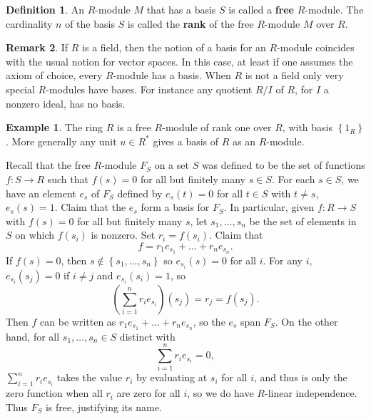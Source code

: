 \documentclass{article}
\newcommand{\rb}[1]{\left( #1 \right)}
\newcommand{\cb}[1]{\left\{ #1 \right\}}
\theoremstyle{definition}\newtheorem{definition}{Definition}[subsection]
\theoremstyle{definition}\newtheorem{remark}[definition]{Remark}
\theoremstyle{definition}\newtheorem*{example}{Example}
\theoremstyle{definition}\newtheorem*{note}{Note}
\begin{document}
\begin{definition}
An $ R $-module $ M $ that has a basis $ S $ is called a \textbf{free} $ R $-module. The cardinality $ n $ of the basis $ S $ is called the \textbf{rank} of the free $ R $-module $ M $ over $ R $.
\end{definition}


\begin{remark}
If $ R $ is a field, then the notion of a basis for an $ R $-module coincides with the usual notion for vector spaces. In this case, at least if one assumes the axiom of choice, every $ R $-module has a basis. When $ R $ is not a field only very special $ R $-modules have bases. For instance any quotient $ R / I $ of $ R $, for $ I $ a nonzero ideal, has no basis.
\end{remark}

\begin{example}
The ring $ R $ is a free $ R $-module of rank one over $ R $, with basis $ \cb{1_R} $. More generally any unit $ u \in R^* $ gives a basis of $ R $ as an $ R $-module.
\end{example}

Recall that the free $ R $-module $ F_S $ on a set $ S $ was defined to be the set of functions $ f : S \to R $ such that $ f\rb{s} = 0 $ for all but finitely many $ s \in S $. For each $ s \in S $, we have an element $ e_s $ of $ F_S $ defined by $ e_s\rb{t} = 0 $ for all $ t \in S $ with $ t \ne s $, $ e_s\rb{s} = 1 $. Claim that the $ e_s $ form a basis for $ F_S $. In particular, given $ f : R \to S $ with $ f\rb{s} = 0 $ for all but finitely many $ s $, let $ s_1, \dots, s_n $ be the set of elements in $ S $ on which $ f\rb{s_i} $ is nonzero. Set $ r_i = f\rb{s_i} $. Claim that
$$ f = r_1e_{s_1} + \dots + r_ne_{s_n}. $$
If $ f\rb{s} = 0 $, then $ s \notin \cb{s_1, \dots, s_n} $ so $ e_{s_i}\rb{s} = 0 $ for all $ i $. For any $ i $, $ e_{s_i}\rb{s_j} = 0 $ if $ i \ne j $ and $ e_{s_i}\rb{s_i} = 1 $, so
$$ \rb{\sum_{i = 1}^n r_ie_{s_i}}\rb{s_j} = r_j = f\rb{s_j}. $$
Then $ f $ can be written as $ r_1e_{s_1} + \dots + r_ne_{s_n} $, so the $ e_s $ span $ F_S $. On the other hand, for all $ s_1, \dots, s_n \in S $ distinct with
$$ \sum_{i = 1}^n r_ie_{s_i} = 0, $$
$ \sum_{i = 1}^n r_ie_{s_i} $ takes the value $ r_i $ by evaluating at $ s_i $ for all $ i $, and thus is only the zero function when all $ r_i $ are zero for all $ i $, so we do have $ R $-linear independence. Thus $ F_S $ is free, justifying its name.
\end{document}
